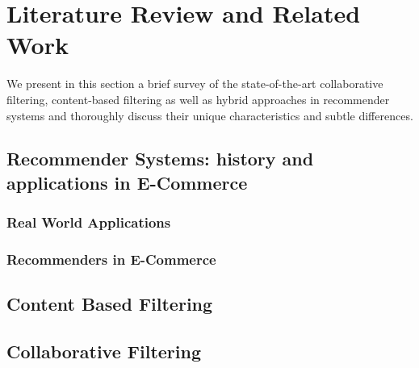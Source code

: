 
\chapter{Literature Review and Related Work} %
\label{Chapter2} %

We present in this section a brief survey of the state-of-the-art collaborative filtering, content-based filtering as well as hybrid  approaches in recommender systems and thoroughly discuss their unique characteristics and subtle differences.  



\section{Recommender Systems: history and applications in E-Commerce}
\label{chp2-sec1}

\subsection{Real World Applications}
\label{chp2-sec1.1}



\subsection{Recommenders in E-Commerce}
\label{chp2-sec1.2}

\section{Content Based Filtering}
\label{chp2-sec2}

\section{Collaborative Filtering}
\label{chp2-sec3}

